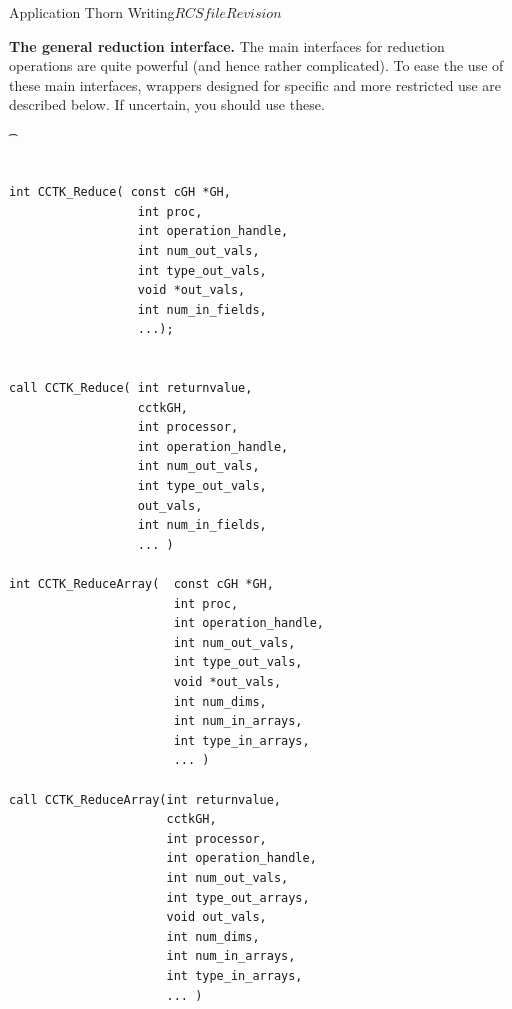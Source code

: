 \begin{cactuspart}{Application Thorn Writing}{$RCSfile$}{$Revision$}
\vskip 0.25cm


{\bf The general reduction interface.}
The main interfaces for reduction operations are quite powerful (and
hence rather complicated). To ease the use of these main interfaces, wrappers
designed for specific and more restricted use are described below. If 
uncertain, you should use these.

{\t
\begin{verbatim}

int CCTK_Reduce( const cGH *GH, 
                  int proc,
                  int operation_handle,
                  int num_out_vals,
                  int type_out_vals,
                  void *out_vals,
                  int num_in_fields,
                  ...);


call CCTK_Reduce( int returnvalue, 
                  cctkGH, 
                  int processor,
                  int operation_handle,
                  int num_out_vals,
                  int type_out_vals,
                  out_vals,
                  int num_in_fields,
                  ... )

int CCTK_ReduceArray(  const cGH *GH,
                       int proc,
                       int operation_handle,
                       int num_out_vals,
                       int type_out_vals,
                       void *out_vals,
                       int num_dims,
                       int num_in_arrays,
                       int type_in_arrays,
                       ... )

call CCTK_ReduceArray(int returnvalue,
                      cctkGH,
                      int processor,
                      int operation_handle,
                      int num_out_vals,
                      int type_out_arrays,
                      void out_vals,
                      int num_dims,
                      int num_in_arrays,
                      int type_in_arrays,
                      ... )
\end{verbatim}
}


\end{cactuspart}
